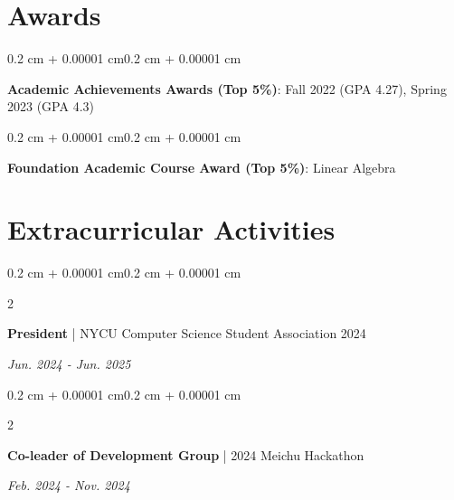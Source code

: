 \documentclass[10pt, letterpaper]{article}
\newenvironment{highlights}{
    \begin{itemize}[
        topsep=0.05 cm,
        parsep=0.05 cm,
        partopsep=0pt,
        itemsep=0pt,
        leftmargin=0.4 cm + 10pt
    ]
}{
    \end{itemize}
}
\newenvironment{onecolentry}{
    \begin{adjustwidth}{0.2 cm + 0.00001 cm}{0.2 cm + 0.00001 cm}
}{
    \end{adjustwidth}
}
\newenvironment{twocolentry}[2][]{
    \onecolentry
    \def\secondColumn{#2}
    \setcolumnwidth{\fill, 4.5 cm}
    \begin{paracol}{2}
}{
    \switchcolumn \raggedleft \secondColumn
    \end{paracol}
    \endonecolentry
}
\let\hrefWithoutArrow\href
\renewcommand{\href}[2]{\hrefWithoutArrow{#1}{\ifthenelse{\equal{#2}{}}{ }{#2 }\raisebox{.15ex}{\footnotesize \faExternalLink*}}}
\begin{document}
    \section{Awards}
        \begin{onecolentry}
            \textbf{Academic Achievements Awards (Top 5\%)}: Fall 2022 (GPA 4.27), Spring 2023 (GPA 4.3)
        \end{onecolentry}
        
        \vspace{0.15 cm}
        \begin{onecolentry}
            \textbf{Foundation Academic Course Award (Top 5\%)}: Linear Algebra
        \end{onecolentry}

    \section{Extracurricular Activities}

        \begin{twocolentry}{\textit{Jun. 2024 - Jun. 2025}}
                \textbf{President} | NYCU Computer Science Student Association 2024
        \end{twocolentry}
        
        
        \vspace{0.15 cm}
        \begin{twocolentry}{\textit{Feb. 2024 - Nov. 2024}}
                \textbf{Co-leader of Development Group} | 2024 Meichu Hackathon
        \end{twocolentry}
    
\end{document}
